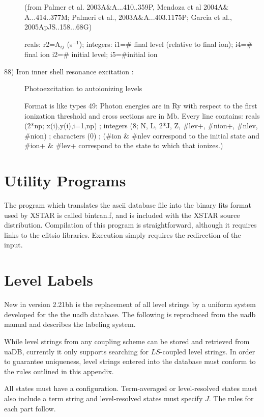 \begin{description}
(from Palmer et al. 2003A$\&$A...410..359P, Mendoza et al  2004A$\&$A...414..377M;
Palmeri et al., 2003A$\&$A...403.1175P; Garcia et al.,  2005ApJS..158...68G)

reals: r2=A$_{ij}$ (s$^{-1}$); 
integers:
i1=$\#$ final level (relative to final ion); i4=$\#$final ion
i2=$\#$ initial level; i5=$\#$initial ion


\item[88) Iron inner shell resonance excitation  :]
Photoexcitation to autoionizing levels

Format is like types 49:
 Photon energies are in Ry with respect to the first ionization threshold 
and cross sections are in Mb.
 Every line  contains:
 reals (2*np; x(i),y(i),i=1,np)
; integers (8; N, L, 2*J, Z, $\#$lev+, $\#$nion+, $\#$nlev, $\#$nion)
; characters (0)
; ($\#$ion $\&$ $\#$nlev correspond to the initial state and $\#$ion+ $\&$ $\#$lev+
 correspond to the state to which that ionizes.) 


\end{description}

\section{Utility Programs}

The program which translates the ascii database file into the binary 
fits format used by XSTAR is called bintran.f, and is included 
with the XSTAR source distribution.  Compilation of this program is 
straightforward, although it requires links to the cfitsio libraries.
Execution simply requires the redirection of the input.


\section{Level Labels}

New in version 2.21bh is the replacement of all level strings by a uniform 
system developed for the the uadb database.  The following is reproduced from 
the uadb manual and describes the labeling system.


While level strings from any coupling scheme can be stored and retrieved from
uaDB, currently it only supports searching for $LS$-coupled level strings.
In order to guarantee uniqueness, level strings entered into the database must
conform to the rules outlined in this appendix.

All states must have a configuration.
Term-averaged or level-resolved states must also include a term string and
level-resolved states must specify $J$.
The rules for each part follow.


